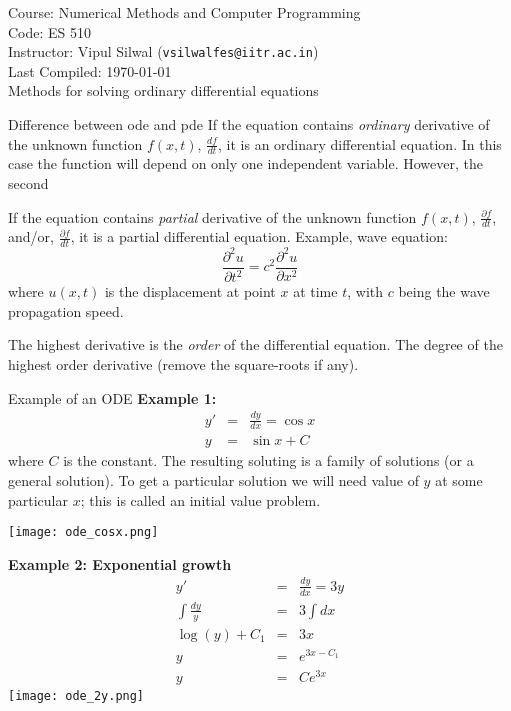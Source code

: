 \documentclass[11pt,titlepage,fleqn]{article}
\begin{document}
\noindent Course: Numerical Methods and Computer Programming\\
\noindent Code: ES 510\\
\noindent Instructor: Vipul Silwal (\verb+vsilwalfes@iitr.ac.in+) \\ 
\noindent Last Compiled: \today \\

{\huge Methods for solving ordinary differential equations}

\tableofcontents
\begin{section}{Difference between ode and pde}
If the equation contains {\it ordinary} derivative of the unknown function $f(x,t)$, \ie $\frac{df}{dt}$, it is an ordinary differential equation. In this case the function will depend on only one independent variable. However, the second 

If the equation contains {\it partial} derivative of the unknown function $f(x,t)$, \ie $\frac{\partial f}{dt}$, and/or, $\frac{\partial f}{dt}$, it is a partial differential equation. Example, wave equation:
\begin{equation}
\frac{\partial ^2 u}{\partial t^2} = c^2 \frac{\partial ^2 u}{\partial x^2}
\end{equation}
where $u(x,t)$ is the displacement at point $x$ at time $t$, with $c$ being the wave propagation speed.

The highest derivative is the {\it order} of the differential equation. The degree of the highest order derivative (remove the square-roots if any).
\end{section}

\begin{section}{Example of an ODE}
{\bf Example 1:}
\begin{eqnarray*}
y' &=& \frac{dy}{dx} = \cos x\\
y &=& \sin x + C
\end{eqnarray*}
where $C$ is the constant. The resulting soluting is a family of solutions (or a general solution). To get a particular solution we will need value of $y$ at some particular $x$; this is called an initial value problem.

\texttt{[image: ode\_cosx.png]}
\end{section}

{\bf Example 2: Exponential growth}
\begin{eqnarray*}
y' &=& \frac{dy}{dx} = 3y\\
\int \frac{dy}{y} &=& 3 \int dx \\
\log(y) + C_1 &=& 3x \\
y &=& e^{3x - C_1} \\
y &=& Ce^{3x}
\end{eqnarray*}
\texttt{[image: ode\_2y.png]}
\end{document}
